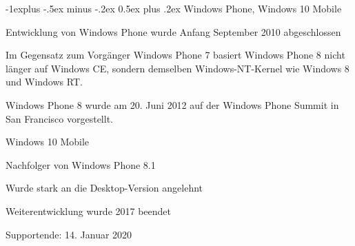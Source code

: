 \documentclass[a4paper]{article}
\makeatletter
\renewcommand{\subsection}{\@startsection{subsection}{2}{0mm}%
                                {-1explus -.5ex minus -.2ex}%
                                {0.5ex plus .2ex}%
                                {\normalfont\normalsize\bfseries}}
\makeatother
\begin{document}
\begin{multicols*}{2}
  \subsection{Windows Phone, Windows 10 Mobile}
  \begin{itemize*}
    \item Entwicklung von Windows Phone wurde Anfang September 2010 abgeschlossen
    \item Im Gegensatz zum Vorgänger Windows Phone 7 basiert Windows Phone 8 nicht länger auf Windows CE, sondern demselben Windows-NT-Kernel wie Windows 8 und Windows RT.
    \item Windows Phone 8 wurde am 20. Juni 2012 auf der Windows Phone Summit in San Francisco vorgestellt.
    \item Windows 10 Mobile
    \begin{itemize*}
      \item Nachfolger von Windows Phone 8.1
      \item Wurde stark an die Desktop-Version angelehnt
      \item Weiterentwicklung wurde 2017 beendet
      \item Supportende: 14. Januar 2020
    \end{itemize*}
  \end{itemize*}


\end{multicols*}
\end{document}
